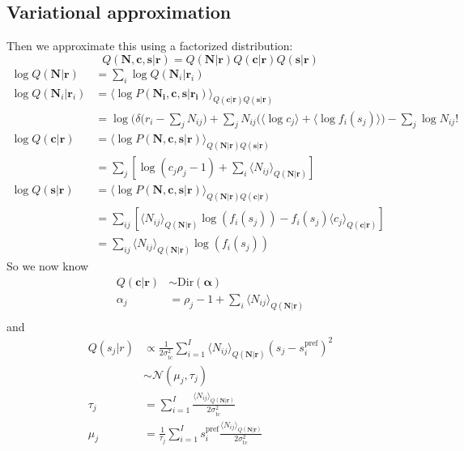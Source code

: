 \documentclass[12pt]{article}
\begin{document}
\subsection{Variational approximation}
Then we approximate this using a factorized distribution:
\begin{equation}
Q(\mathbf{N, c, s|r}) = Q(\mathbf{N|r}) Q(\mathbf{c|r}) Q(\mathbf{s|r})
\end{equation}
\begin{equation}
\begin{aligned}
\log Q(\mathbf{N}|\mathbf{r}) &= \sum_i \log Q(\mathbf{N}_i|\mathbf{r}_i)\\
\log Q(\mathbf{N}_i|\mathbf{r}_i) &= \langle \log P(\mathbf{N_i, c, s|r_i}) \rangle_{Q(\mathbf{c|r})Q(\mathbf{s|r})}\\
&= \log(\delta \Big( r_i - \sum_j N_{ij} \Big) + \sum_j N_{ij}\big( \langle \log c_j \rangle + \langle \log f_i(s_j) \rangle \big) - \sum_j \log N_{ij}!\\
\log Q(\mathbf{c|r}) &= \langle \log P(\mathbf{N, c, s|r}) \rangle_{Q(\mathbf{N|r})Q(\mathbf{s|r})}\\
&= \sum_j [\log (c_j \rho_j - 1) + \sum_i \langle N_{ij} \rangle_{Q(\mathbf{N|r})}]\\
\log Q(\mathbf{s|r}) &= \langle \log P(\mathbf{N, c, s|r}) \rangle_{Q(\mathbf{N|r})Q(\mathbf{c|r})}\\
&= \sum_{ij} [\langle N_{ij} \rangle_{Q(\mathbf{N|r})} \log(f_i(s_j)) - f_i(s_j) \langle c_j \rangle_{Q(\mathbf{c|r})}]\\ 
&= \sum_{ij} \langle N_{ij} \rangle_{Q(\mathbf{N|r})} \log(f_i(s_j))
\end{aligned}
\end{equation}
So we now know
\begin{equation}
\begin{aligned}
Q(\mathbf{c|r}) &\sim \text{Dir}(\boldsymbol{\alpha})\\
\alpha_j &= \rho_j - 1 + \sum_i \langle N_{ij} \rangle_{Q(\mathbf{N|r})}\\
\end{aligned}
\end{equation}
and 
\begin{equation}
\begin{aligned}
Q(s_j|r) &\propto \frac{1}{2 \sigma_{\text{tc}}^2} \sum_{i=1}^I \langle N_{ij} \rangle_{Q(\mathbf{N|r})} (s_j - s_i^{\text{pref}})^2\\
&\sim \mathcal{N} (\mu_j, \tau_j)\\ 
\tau_j &= \sum_{i=1}^I \frac{\langle N_{ij} \rangle_{Q(\mathbf{N|r})}}{2 \sigma_{\text{tc}}^2}\\
\mu_j &= \frac{1}{\tau_j} \sum_{i=1}^I s_i^{\text{pref}} \frac{\langle N_{ij} \rangle_{Q(\mathbf{N|r})}}{2 \sigma_{\text{tc}}^2}\\
\end{aligned}
\end{equation}
\end{document}
